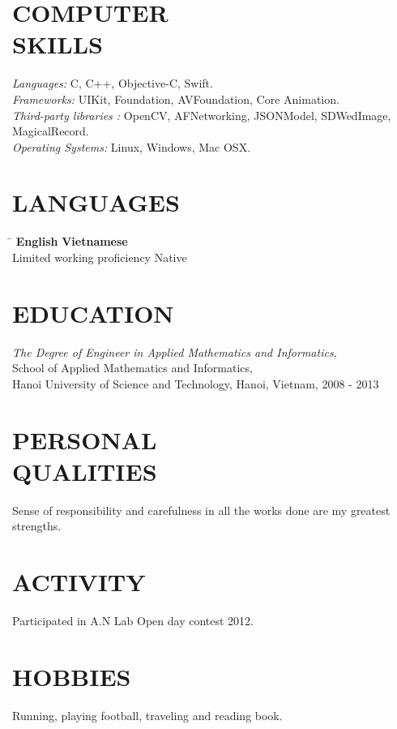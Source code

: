 \documentclass[margin, 10pt]{res}
\begin{document}
\begin{resume}
\section{COMPUTER \\ SKILLS}
   {\sl Languages:} C, C++, Objective-C, Swift.\\
   {\sl Frameworks:} UIKit, Foundation, AVFoundation, Core Animation.\\
   {\sl Third-party libraries :} OpenCV, AFNetworking, JSONModel, SDWedImage, MagicalRecord.\\
   {\sl Operating Systems:} Linux, Windows, Mac OSX.

\section{LANGUAGES}
	\vspace{-0.1in}
	\begin{tabbing}
    \hspace{2.8in}\= \kill %
    \textbf{English}            \> \textbf{Vietnamese}\\
    Limited working proficiency \> Native\\
	\end{tabbing}\vspace{-20pt}
	
\section{EDUCATION}
   {\sl The Degree of Engineer in Applied Mathematics and Informatics,}\\
   School of Applied Mathematics and Informatics, \\
   Hanoi University of Science and Technology, Hanoi, Vietnam, 2008 - 2013 \\
	
\section{PERSONAL \\ QUALITIES} Sense of responsibility and carefulness in all the works done are my greatest strengths.\\
 
\section{ACTIVITY} Participated in A.N Lab Open day contest 2012.

\section{HOBBIES} Running, playing football, traveling and reading book.

\end{resume}
\end{document}
